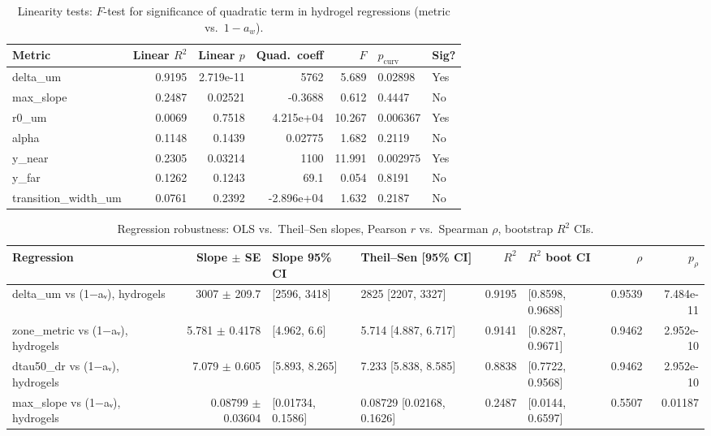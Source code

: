 \begin{table}[htbp]
\centering
\caption{Linearity tests: $F$-test for significance of quadratic term in hydrogel regressions (metric vs.\ $1-a_w$).}
\label{tab:linearity}
\begin{tabular}{l rr rr l}
\toprule
Metric & Linear $R^2$ & Linear $p$ & Quad.~coeff & $F$ & $p_{\text{curv}}$ & Sig? \\
\midrule
delta_um & 0.9195 & 2.719e-11 & 5762 & 5.689 & 0.02898 & Yes \\
max_slope & 0.2487 & 0.02521 & -0.3688 & 0.612 & 0.4447 & No \\
r0_um & 0.0069 & 0.7518 & 4.215e+04 & 10.267 & 0.006367 & Yes \\
alpha & 0.1148 & 0.1439 & 0.02775 & 1.682 & 0.2119 & No \\
y_near & 0.2305 & 0.03214 & 1100 & 11.991 & 0.002975 & Yes \\
y_far & 0.1262 & 0.1243 & 69.1 & 0.054 & 0.8191 & No \\
transition_width_um & 0.0761 & 0.2392 & -2.896e+04 & 1.632 & 0.2187 & No \\
\bottomrule
\end{tabular}
\end{table}

\begin{table}[htbp]
\centering
\small
\caption{Regression robustness: OLS vs.\ Theil--Sen slopes, Pearson $r$ vs.\ Spearman $\rho$, bootstrap $R^2$ CIs.}
\label{tab:robustness}
\begin{tabular}{l r l l r l rr}
\toprule
Regression & Slope $\pm$ SE & Slope 95\% CI & Theil--Sen [95\% CI] & $R^2$ & $R^2$ boot CI & $\rho$ & $p_\rho$ \\
\midrule
delta_um vs (1−aᵥ), hydrogels & 3007 $\pm$ 209.7 & [2596, 3418] & 2825 [2207, 3327] & 0.9195 & [0.8598, 0.9688] & 0.9539 & 7.484e-11 \\
zone_metric vs (1−aᵥ), hydrogels & 5.781 $\pm$ 0.4178 & [4.962, 6.6] & 5.714 [4.887, 6.717] & 0.9141 & [0.8287, 0.9671] & 0.9462 & 2.952e-10 \\
dtau50_dr vs (1−aᵥ), hydrogels & 7.079 $\pm$ 0.605 & [5.893, 8.265] & 7.233 [5.838, 8.585] & 0.8838 & [0.7722, 0.9568] & 0.9462 & 2.952e-10 \\
max_slope vs (1−aᵥ), hydrogels & 0.08799 $\pm$ 0.03604 & [0.01734, 0.1586] & 0.08729 [0.02168, 0.1626] & 0.2487 & [0.0144, 0.6597] & 0.5507 & 0.01187 \\
\bottomrule
\end{tabular}
\end{table}


